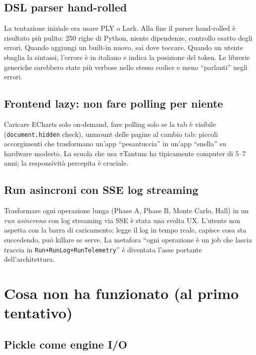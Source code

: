 \subsection{DSL parser hand-rolled}

La tentazione iniziale era usare PLY o Lark. Alla fine il
parser hand-rolled \`e risultato pi\`u pulito: 250 righe di
Python, niente dipendenze, controllo esatto degli errori.
Quando aggiungi un built-in nuovo, sai dove toccare. Quando
un utente sbaglia la sintassi, l'errore \`e in italiano e
indica la posizione del token. Le librerie generiche
sarebbero state pi\`u verbose nello stesso codice e meno
``parlanti'' negli errori.

\subsection{Frontend lazy: non fare polling per niente}

Caricare ECharts solo on-demand, fare polling solo se la
tab \`e visibile (\texttt{document.hidden} check), unmount
delle pagine al cambio tab: piccoli accorgimenti che
trasformano un'app ``pesantuccia'' in un'app ``snella'' su
hardware modesto. La scuola che usa $\pi$Tantum ha
tipicamente computer di 5--7 anni; la responsivit\`a percepita
\`e cruciale.

\subsection{Run asincroni con SSE log streaming}

Trasformare ogni operazione lunga (Phase A, Phase B,
Monte Carlo, Hall) in un \emph{run asincrono} con log
streaming via SSE \`e stata una svolta UX. L'utente non aspetta
con la barra di caricamento; legge il log in tempo reale,
capisce cosa sta succedendo, pu\`o killare se serve. La
metafora ``ogni operazione \`e un job che lascia traccia in
\texttt{Run+RunLog+RunTelemetry}'' \`e diventata l'asse
portante dell'architettura.

\section{Cosa non ha funzionato (al primo tentativo)}

\subsection{Pickle come engine I/O}


